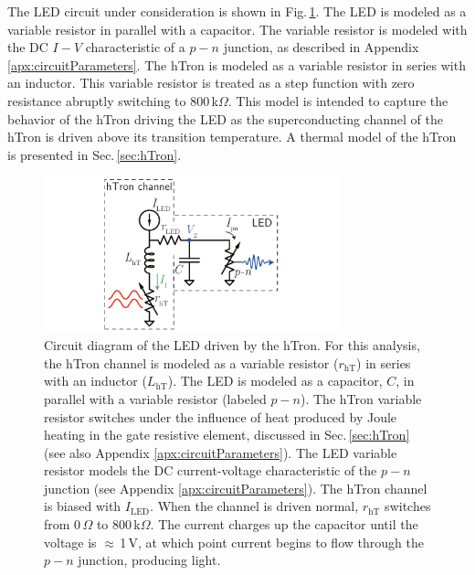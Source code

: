 \documentclass[aip,amsmath,amssymb,reprint,nofootinbib]{revtex4-1}
\begin{document}
The LED circuit under consideration is shown in Fig.\,\ref{fig:transmitters_LED_circuit}. The LED is modeled as a variable resistor in parallel with a capacitor. The variable resistor is modeled with the DC $I-V$ characteristic of a $p-n$ junction, as described in Appendix \ref{apx:circuitParameters}. The hTron is modeled as a variable resistor in series with an inductor. This variable resistor is treated as a step function with zero resistance abruptly switching to 800\,k$\Omega$. This model is intended to capture the behavior of the hTron driving the LED as the superconducting channel of the hTron is driven above its transition temperature. A thermal model of the hTron is presented in Sec.\,\ref{sec:hTron}.
\begin{figure}[t!]
	\centerline{\includegraphics[width=8.6cm]{_transmitters_LED_circuit_small.pdf}}
	\caption{\label{fig:transmitters_LED_circuit}Circuit diagram of the LED driven by the hTron. For this analysis, the hTron channel is modeled as a variable resistor ($r_{\mathrm{hT}}$) in series with an inductor ($L_{\mathrm{hT}}$). The LED is modeled as a capacitor, $C$, in parallel with a variable resistor (labeled $p-n$). The hTron variable resistor switches under the influence of heat produced by Joule heating in the gate resistive element, discussed in Sec.\,\ref{sec:hTron} (see also Appendix \ref{apx:circuitParameters}). The LED variable resistor models the DC current-voltage characteristic of the $p-n$ junction (see Appendix \ref{apx:circuitParameters}). The hTron channel is biased with $I_{\mathrm{LED}}$. When the channel is driven normal, $r_{\mathrm{hT}}$ switches from 0\,$\Omega$ to $800$\,k$\Omega$. The current charges up the capacitor until the voltage is $\approx$\,1\,V, at which point current begins to flow through the $p-n$ junction, producing light.}
\end{figure}
\end{document}
